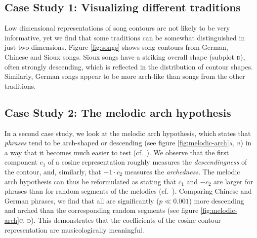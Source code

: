 \documentclass{article}
\begin{document}
\subsection{Case Study 1: Visualizing different traditions}


Low dimensional representations of song contours are not likely to be very informative, yet we find that some traditions can be somewhat distinguished in just two dimensions.
Figure \ref{fig:songs} shows song contours from German, Chinese and Sioux songs.
Sioux songs have a striking overall shape (subplot \textsc{d}), often strongly descending, which is reflected in the distribution of contour shapes.
Similarly, German songs appear to be more arch-like than songs from the other traditions.


\subsection{Case Study 2: The melodic arch hypothesis}


In a second case study, we look at the melodic arch hypothesis, which states that \emph{phrases} tend to be arch-shaped or descending \cite{Huron1996} (see figure \ref{fig:melodic-arch}\textsc{a, b}) in a way that it becomes much easier to test (cf.~\cite{Savage2017a}).
We observe that the first component $c_1$ of a cosine representation roughly measures the \emph{descendingness} of the contour, and, similarly, that $-1\cdot c_2$ measures the \emph{archedness}.
The melodic arch hypothesis can thus be reformulated as stating that $c_1$ and $-c_2$ are larger for phrases than %
for random segments of the melodies (cf.~\cite{Cornelissen2020DLfM}).
Comparing Chinese and German phrases, we find that all are significantly ($p \ll 0.001$) more descending and arched than the corresponding random segments (see figure \ref{fig:melodic-arch}\textsc{c, d}).
This demonstrates that the coefficients of the cosine contour representation are musicologically meaningful.
\end{document}
